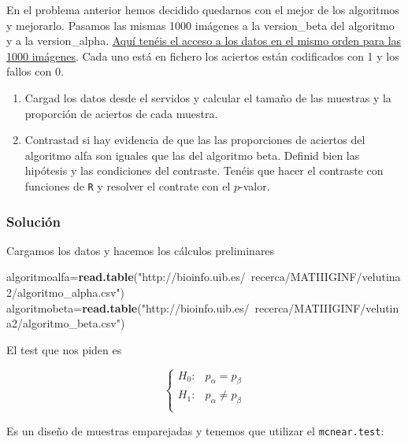 \documentclass[
]{article}
\newenvironment{Shaded}{\begin{snugshade}}{\end{snugshade}}
\newcommand{\KeywordTok}[1]{\textcolor[rgb]{0.13,0.29,0.53}{\textbf{#1}}}
\newcommand{\NormalTok}[1]{#1}
\newcommand{\StringTok}[1]{\textcolor[rgb]{0.31,0.60,0.02}{#1}}
\providecommand{\tightlist}{%
  \setlength{\itemsep}{0pt}\setlength{\parskip}{0pt}}
\begin{document}
En el problema anterior hemos decidido quedarnos con el mejor de los
algoritmos y mejorarlo. Pasamos las mismas 1000 imágenes a la
version\_beta del algoritmo y a la version\_alpha.
\href{http://bioinfo.uib.es/~recerca/MATIIIGINF/velutina2}{Aquí tenéis
el acceso a los datos en el mismo orden para las 1000 imágenes}. Cada
uno está en fichero los aciertos están codificados con 1 y los fallos
con 0.

\begin{enumerate}
\def\labelenumi{\arabic{enumi}.}
\tightlist
\item
  Cargad los datos desde el servidos y calcular el tamaño de las
  muestras y la proporción de aciertos de cada muestra.
\item
  Contrastad si hay evidencia de que las las proporciones de aciertos
  del algoritmo alfa son iguales que las del algoritmo beta. Definid
  bien las hipótesis y las condiciones del contraste. Tenéis que hacer
  el contraste con funciones de \texttt{R} y resolver el contrate con el
  \(p\)-valor.
\end{enumerate}

\hypertarget{soluciuxf3n-1}{%
\subsubsection{Solución}\label{soluciuxf3n-1}}

Cargamos los datos y hacemos los cálculos preliminares

\begin{Shaded}
\begin{Highlighting}[]
\NormalTok{algoritmoalfa=}\KeywordTok{read.table}\NormalTok{(}\StringTok{"http://bioinfo.uib.es/~recerca/MATIIIGINF/velutina2/algoritmo_alpha.csv"}\NormalTok{)}
\NormalTok{algoritmobeta=}\KeywordTok{read.table}\NormalTok{(}\StringTok{"http://bioinfo.uib.es/~recerca/MATIIIGINF/velutina2/algoritmo_beta.csv"}\NormalTok{)}
\end{Highlighting}
\end{Shaded}

El test que nos piden es

\[
\left\{
\begin{array}{ll}
H_0: & p_{\alpha}=p_{\beta}\\
H_1: & p_{\alpha}\not=p_{\beta}\\
\end{array}
\right.
\]

Es un diseño de muestras emparejadas y tenemos que utilizar el
\texttt{mcnear.test}:
\end{document}
